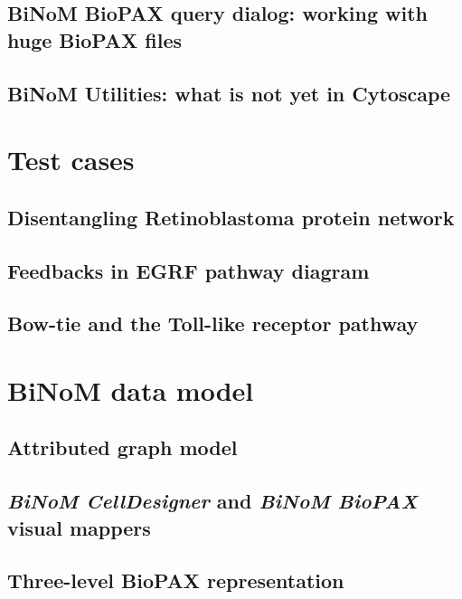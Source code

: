 \documentclass[12pt]{book}
\begin{document}
\section{BiNoM BioPAX query dialog: working with huge BioPAX files}

\section{BiNoM Utilities: what is not yet in Cytoscape}

\chapter{Test cases}

\section{Disentangling Retinoblastoma protein network}

\section{Feedbacks in EGRF pathway diagram}

\section{Bow-tie and the Toll-like receptor pathway}

\chapter{BiNoM data model}

\section{Attributed graph model}

\section{{\it BiNoM CellDesigner} and {\it BiNoM BioPAX} visual mappers}

\section{Three-level BioPAX representation}


\begin{thebibliography}{99}


\end{thebibliography}
\end{document}
